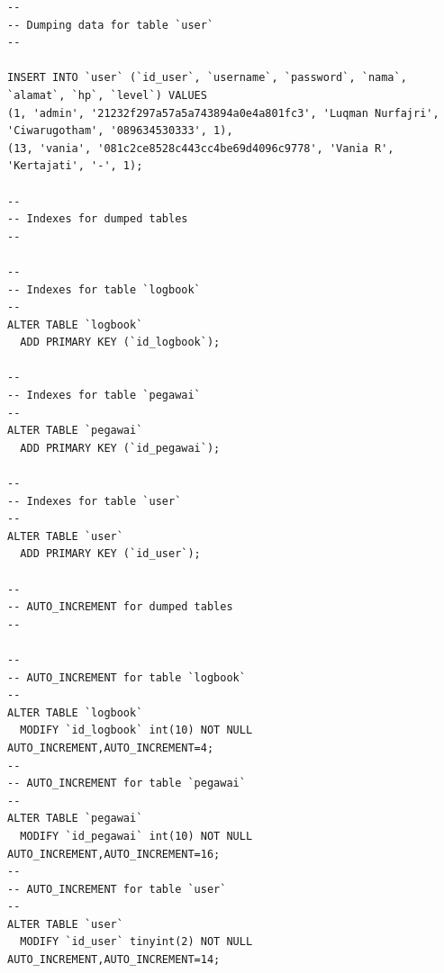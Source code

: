 \begin{enumerate}
\begin{lstlisting}
--
-- Dumping data for table `user`
--

INSERT INTO `user` (`id_user`, `username`, `password`, `nama`, `alamat`, `hp`, `level`) VALUES
(1, 'admin', '21232f297a57a5a743894a0e4a801fc3', 'Luqman Nurfajri', 'Ciwarugotham', '089634530333', 1),
(13, 'vania', '081c2ce8528c443cc4be69d4096c9778', 'Vania R', 'Kertajati', '-', 1);

--
-- Indexes for dumped tables
--

--
-- Indexes for table `logbook`
--
ALTER TABLE `logbook`
  ADD PRIMARY KEY (`id_logbook`);

--
-- Indexes for table `pegawai`
--
ALTER TABLE `pegawai`
  ADD PRIMARY KEY (`id_pegawai`);

--
-- Indexes for table `user`
--
ALTER TABLE `user`
  ADD PRIMARY KEY (`id_user`);

--
-- AUTO_INCREMENT for dumped tables
--

--
-- AUTO_INCREMENT for table `logbook`
--
ALTER TABLE `logbook`
  MODIFY `id_logbook` int(10) NOT NULL AUTO_INCREMENT,AUTO_INCREMENT=4;
--
-- AUTO_INCREMENT for table `pegawai`
--
ALTER TABLE `pegawai`
  MODIFY `id_pegawai` int(10) NOT NULL AUTO_INCREMENT,AUTO_INCREMENT=16;
--
-- AUTO_INCREMENT for table `user`
--
ALTER TABLE `user`
  MODIFY `id_user` tinyint(2) NOT NULL AUTO_INCREMENT,AUTO_INCREMENT=14;
\end{lstlisting}

\end{enumerate}

